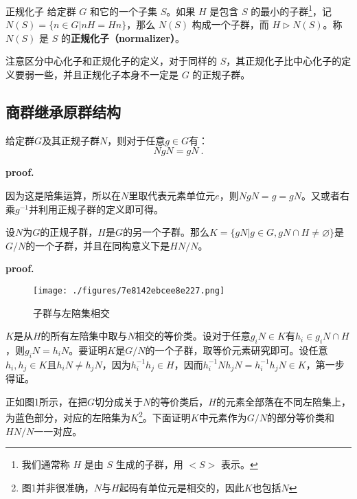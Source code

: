 \begin{definition}{正规化子}\label{def_NormSG_2}
给定群 $G$ 和它的一个子集 $S$。如果 $H$ 是包含 $S$ 的最小的子群\footnote{我们通常称 $H$ 是由 $S$ 生成的子群，用 $<S>$ 表示。}，记 $N(S)=\{n\in G|nH=Hn\}$，那么 $N(S)$ 构成一个子群，而 $H\vartriangleright N(S)$。称 $N(S)$ 是 $S$ 的\textbf{正规化子（normalizer）}。
\end{definition}

注意区分中心化子和正规化子的定义，对于同样的 $S$，其正规化子比中心化子的定义要弱一些，并且正规化子本身不一定是 $G$ 的正规子群。
\subsection{商群继承原群结构}
\begin{lemma}{}\label{lem_NormSG_1}
给定群$G$及其正规子群$N$，则对于任意$g\in G$有：
\begin{equation}
NgN=gN~.
\end{equation}
\end{lemma}
\textbf{proof.}

因为这是陪集运算，所以在$N$里取代表元素单位元$e$，则$NgN=g=gN$。又或者右乘$g^{-1}$并利用正规子群的定义即可得。
\begin{theorem}{}\label{the_NormSG_1}
设$N$为$G$的正规子群，$H$是$G$的另一个子群。那么$K=\{gN|g\in G,gN\cap H\neq \varnothing \}$是$G/N$的一个子群，并且在同构意义下是$HN/N$。
\end{theorem}
\textbf{proof.}
\begin{figure}[ht]
\centering
\texttt{[image: ./figures/7e8142ebcee8e227.png]}
\caption{子群与左陪集相交} \label{fig_NormSG_1}
\end{figure}





$K$是从$H$的所有左陪集中取与$N$相交的等价类。设对于任意$g_iN\in K$有$h_i\in g_iN\cap H$，则$g_iN=h_iN$。要证明$K$是$G/N$的一个子群，取等价元素研究即可。设任意$h_i,h_j\in K$且$h_iN\neq h_jN$，因为$h_i^{-1}h_j\in H$，因而$h_i^{-1}Nh_jN=h_i^{-1}h_jN\in K$，第一步得证。

正如图1所示，在把$G$切分成关于$N$的等价类后，$H$的元素全部落在不同左陪集上，为蓝色部分，对应的左陪集为$K$\footnote{图1并非很准确，$N$与$H$起码有单位元是相交的，因此$K$也包括$N$}。下面证明$K$中元素作为$G/N$的部分等价类和$HN/N$一一对应。

